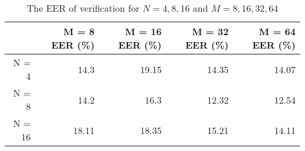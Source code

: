 \begin{table}[htbp]
\centering
\caption{The EER of verification for $N=4,8,16$ and $M=8,16,32,64$}
\begin{tabular}{|r|r|r|r|r|}
\hline
& M = 8  EER (\%) & M = 16  EER (\%) & M = 32  EER (\%) & M = 64  EER (\%) \\
\hline
N = 4 & 14.3  & 19.15 & 14.35 & 14.07 \\ \hline
N = 8 & 14.2  & 16.3  & 12.32 & 12.54 \\ \hline
N = 16 & 18.11 & 18.35 & 15.21 & 14.11 \\
\hline
\end{tabular}%
\label{tab:experiment:parameters}%
\end{table}%
